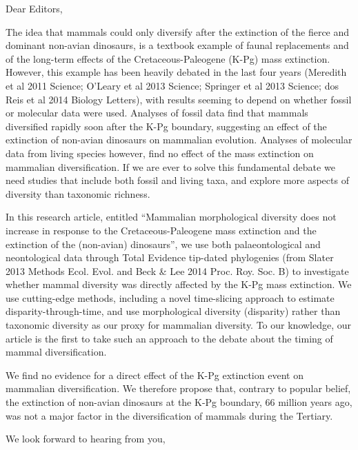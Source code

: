 \documentclass[11pt]{letter}
\begin{document}
\begin{letter}{}
\opening{Dear Editors,}

The idea that mammals could only diversify after the extinction of the fierce and dominant non-avian dinosaurs, is a textbook example of faunal replacements and of the long-term effects of the Cretaceous-Paleogene (K-Pg) mass extinction.
However, this example has been heavily debated in the last four years (Meredith et al 2011 Science; O'Leary et al 2013 Science; Springer et al 2013 Science; dos Reis et al 2014 Biology Letters), with results seeming to depend on whether fossil or molecular data were used. 
Analyses of fossil data find that mammals diversified rapidly soon after the K-Pg boundary, suggesting an effect of the extinction of non-avian dinosaurs on mammalian evolution. 
Analyses of molecular data from living species however, find no effect of the mass extinction on mammalian diversification. 
If we are ever to solve this fundamental debate we need studies that include both fossil and living taxa, and explore more aspects of diversity than taxonomic richness.

In this research article, entitled ``Mammalian morphological diversity does not increase in response to the Cretaceous-Paleogene mass extinction and the extinction of the (non-avian) dinosaurs'', we use both palaeontological and neontological data through Total Evidence tip-dated phylogenies (from Slater 2013 Methods Ecol. Evol. and Beck \& Lee 2014 Proc. Roy. Soc. B) to investigate whether mammal diversity was directly affected by the K-Pg mass extinction. We use cutting-edge methods, including a novel time-slicing approach to estimate disparity-through-time, and use morphological diversity (disparity) rather than taxonomic diversity as our proxy for mammalian diversity.
To our knowledge, our article is the first to take such an approach to the debate about the timing of mammal diversification.

We find no evidence for a direct effect of the K-Pg extinction event on mammalian diversification.
We therefore propose that, contrary to popular belief, the extinction of non-avian dinosaurs at the K-Pg boundary, 66 million years ago, was not a major factor in the diversification of mammals during the Tertiary. 

We look forward to hearing from you,


\end{letter}
\end{document}
